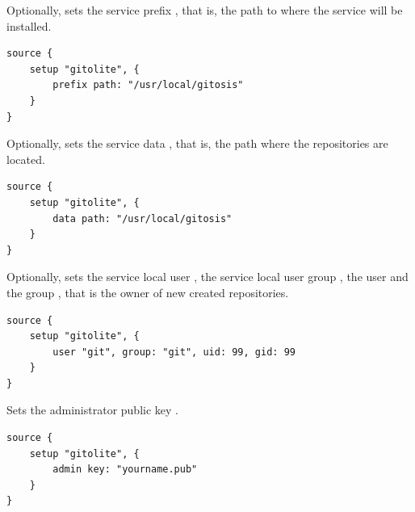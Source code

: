 
Optionally, sets the service prefix , that is, the path to where the service
will be installed.

\begin{lstlisting}[style=Java]
source {
    setup "gitolite", {
        prefix path: "/usr/local/gitosis"
    }
}
\end{lstlisting}


Optionally, sets the service data , that is, the path where the repositories
are located.

\begin{lstlisting}[style=Java]
source {
    setup "gitolite", {
        data path: "/usr/local/gitosis"
    }
}
\end{lstlisting}


Optionally, sets the service local user , the service local user 
group , the user  and the group , that is the 
owner of new created repositories.

\begin{lstlisting}[style=Java]
source {
    setup "gitolite", {
        user "git", group: "git", uid: 99, gid: 99
    }
}
\end{lstlisting}


Sets the administrator public key .

\begin{lstlisting}[style=Java]
source {
    setup "gitolite", {
        admin key: "yourname.pub"
    }
}
\end{lstlisting}
